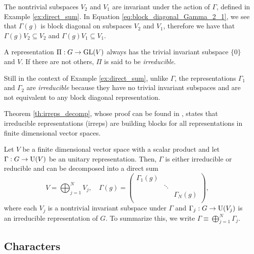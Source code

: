 \begin{example}
The nontrivial subspaces $V_2$ and $V_1$ are invariant under the action of $\Gamma$, defined in Example \ref{ex:direct_sum}. In Equation \ref{eq:block_diagonal_Gamma_2_1}, we see that $\Gamma(g)$ is block diagonal on subspaces $V_2$ and $V_1$, therefore we have that $\Gamma(g) V_2 \subseteq V_2$ and $\Gamma(g) V_1 \subseteq V_1$.
\end{example}

\begin{definition}
A representation $\Pi: G \to {\text{GL}}(V)$ always has the trivial invariant subspace $\{0\}$ and $V$. If there are not others, $\Pi$ is said to be \textit{irreducible}.
\end{definition}

\begin{example}
Still in the context of Example \ref{ex:direct_sum}, unlike $\Gamma$, the representations $\Gamma_1$ and $\Gamma_2$ are \textit{irreducible} because they have no trivial invariant subspaces and are not equivalent to any block diagonal representation.
\end{example}

Theorem \ref{th:irreps_decomp}, whose proof can be found in \cite{dresselhaus, hamermesh}, states that irreducible representations (irreps) are building blocks for all representations in finite dimensional vector spaces.

\begin{theorem} \label{th:irreps_decomp}
Let $V$ be a finite dimensional vector space with a scalar product and let $\Gamma: G \to {\text{U}}(V)$ be an unitary representation. Then, $\Gamma$ is either irreducible or reducible and can be decomposed into a direct sum
$$
V = \bigoplus_{j=1}^N V_j, \quad
\Gamma(g) =
\begin{pmatrix}
\Gamma_1(g) &  &  \\
 & \ddots &  \\
 &  & \Gamma_N(g) \\
\end{pmatrix},
$$
where each $V_j$ is a nontrivial invariant subspace under $\Gamma$ and $\Gamma_j: G \to {\text{U}}(V_j)$ is an irreducible representation of $G$. To summarize this, we write $\Gamma \equiv \bigoplus_{j=1}^N \Gamma_j$.
\end{theorem}

\subsection{Characters} \label{sec:characters}

